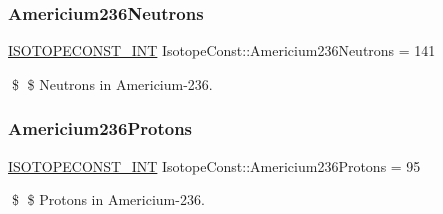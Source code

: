 \subsubsection{\texorpdfstring{Americium236\+Neutrons}{Americium236Neutrons}}
{\footnotesize\ttfamily \mbox{\hyperlink{group___isotope_const-_macros_ga5f18360b3e99483a35c32d789e62621c}{I\+S\+O\+T\+O\+P\+E\+C\+O\+N\+S\+T\+\_\+\+I\+NT}} Isotope\+Const\+::\+Americium236\+Neutrons = 141}

\$ \$ Neutrons in Americium-\/236. \mbox{\label{group___isotope_const-_americium-_am236_ga2ce8cc547af7c6305e6d8a7a3defabe1}} 
\subsubsection{\texorpdfstring{Americium236\+Protons}{Americium236Protons}}
{\footnotesize\ttfamily \mbox{\hyperlink{group___isotope_const-_macros_ga5f18360b3e99483a35c32d789e62621c}{I\+S\+O\+T\+O\+P\+E\+C\+O\+N\+S\+T\+\_\+\+I\+NT}} Isotope\+Const\+::\+Americium236\+Protons = 95}

\$ \$ Protons in Americium-\/236. 